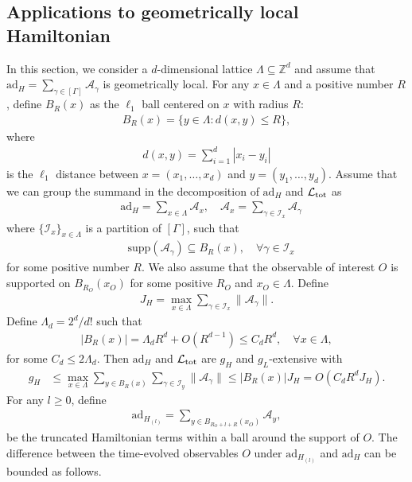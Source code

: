 \documentclass[aps,pra,reprint,groupedaddress,floatfix]{revtex4-2}
\renewcommand{\L}{\mathcal{L}}
\newcommand{\ad}{\mathrm{ad}}
\newcommand{\A}{\mathcal{A}}
\newcommand{\supp}{\mathrm{supp}}
\newcommand{\mc}{\mathcal}
\begin{document}
\subsection{Applications to geometrically local Hamiltonian}
\label{sec:geo-local}
In this section, we consider a $d$-dimensional lattice $\Lambda \subseteq \mathbb{Z}^d$ and assume that $\ad_H = \sum_{\gamma\in [\Gamma]} \A_{\gamma}$ is geometrically local. 
For any $x\in \Lambda$ and a positive number $R$, define $B_R(x)$ as the $\ell_1$ ball centered on $x$ with radius $R$: \begin{align*}
    B_R(x) = \{ y\in \Lambda:d(x,y) \le R\},
\end{align*}
where \begin{align*}
    d(x,y) = \sum_{i=1}^d  |x_i-y_i|
\end{align*}
is the $\ell_1$ distance between $x = (x_1, \ldots, x_d)$ and $y= (y_1, \ldots, y_d)$. 
Assume that we can group the summand in the decomposition of $\ad_H$ and $\L_{\rm tot}$ as \begin{align*}
    &\ad_H = \sum_{x\in {\Lambda}} \A_x, \quad \A_x = \sum_{\gamma\in \mc I_x} \A_{\gamma} 
\end{align*} where $\{\mc I_x\}_{x\in \Lambda}$ is a partition of $[\Gamma]$, such that \begin{align*}
    &\supp(\A_{\gamma}) \subseteq B_R(x), \quad \forall \gamma\in \mc I_x
\end{align*} for some positive number $R$. We also assume that the observable of interest $O$ is supported on $B_{R_O}(x_O)$ for some positive $R_O$ and $x_O\in \Lambda$. Define \begin{align*}
    J_H = \max_{x\in \Lambda}\sum_{\gamma\in \mc I_x} \|\A_{\gamma}\|.
\end{align*} Define $\Lambda_d = 2^d/d!$ such that \begin{align*}
    |B_R(x)| = \Lambda_dR^d + O(R^{d-1})\le C_d R^d, \quad \forall x\in \Lambda,
\end{align*}
for some $C_d\le 2\Lambda_d$.
Then $\ad_H$ and $\L_{\rm tot}$ are $g_H$ and $g_L$-extensive with \begin{align*}
    g_H &\le \max_{x\in \Lambda} \sum_{y\in B_R(x)}\sum_{\gamma\in \mc I_y} \|\A_{\gamma}\|\le |B_R(x)|J_H  = O(C_d R^d J_H).
\end{align*}
For any $l \ge 0$, define\begin{align*}
    \ad_{H_{(l)}} = \sum_{y\in B_{R_O+l+R}(x_O)} \A_y,
\end{align*}
be the truncated Hamiltonian terms within a ball around the support of $O$. The difference between the time-evolved observables $O$ under $\ad_{H_{(l)}}$ and $ \ad_H$ can be bounded as follows. 
\end{document}
